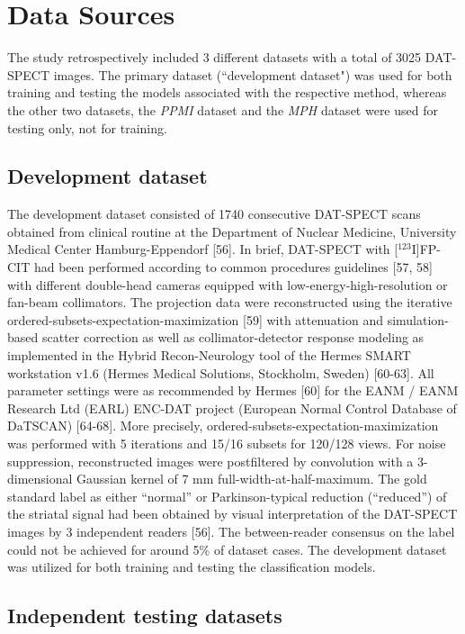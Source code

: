 \section{Data Sources}
\label{sec:data}

The study retrospectively included 3 different datasets with a total of 3025 DAT-SPECT images.
The primary dataset (``development dataset") was used for both training and testing the models associated with the respective method, 
whereas the other two datasets, the \textit{PPMI} dataset and the \textit{MPH} dataset were used for testing only, not for training.

\subsection{Development dataset}
\label{subsec:spect_dataset}

The development dataset consisted of 1740 consecutive DAT-SPECT scans obtained from clinical routine at 
the Department of Nuclear Medicine, University Medical Center Hamburg-Eppendorf [56]. 
In brief, DAT-SPECT with [$^{123}$I]FP-CIT had been performed according to common procedures guidelines [57, 58] with different double-head cameras 
equipped with low-energy-high-resolution or fan-beam collimators. 
The projection data were reconstructed using the iterative ordered-subsets-expectation-maximization [59] with attenuation and simulation-based scatter correction 
as well as collimator-detector response modeling as implemented in the Hybrid Recon-Neurology tool of the Hermes SMART workstation v1.6 (Hermes Medical Solutions, Stockholm, Sweden) [60-63]. 
All parameter settings were as recommended by Hermes [60] for the EANM / EANM Research Ltd (EARL) ENC-DAT project (European Normal Control Database of DaTSCAN) [64-68]. 
More precisely, ordered-subsets-expectation-maximization was performed with 5 iterations and 15/16 subsets for 120/128 views. 
For noise suppression, reconstructed images were postfiltered by convolution with a 3-dimensional Gaussian kernel of 7 mm full-width-at-half-maximum. 
The gold standard label as either “normal” or Parkinson-typical reduction (“reduced”) of the striatal signal had been obtained by visual interpretation of the DAT-SPECT images by 3 independent readers [56]. 
The between-reader consensus on the label could not be achieved for around 5\% of dataset cases.
The development dataset was utilized for both training and testing the classification models. 

\subsection{Independent testing datasets}
\label{subsec:external_dataset}

